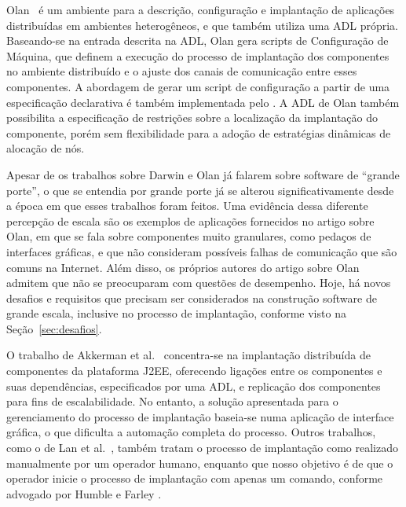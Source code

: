 Olan~\cite{Balter1998Olan} é um ambiente para a descrição, configuração e implantação de aplicações distribuídas em ambientes heterogêneos, e que também utiliza uma ADL própria. Baseando-se na entrada descrita na ADL, Olan gera scripts de Configuração de Máquina, que definem a execução do processo de implantação dos componentes no ambiente distribuído e o ajuste dos canais de comunicação entre esses componentes. A abordagem de gerar um script de configuração a partir de uma especificação declarativa é também implementada pelo \ee. A ADL de Olan também possibilita a especificação de restrições sobre a localização da implantação do componente, porém sem flexibilidade para a adoção de estratégias dinâmicas de alocação de nós.

Apesar de os trabalhos sobre Darwin e Olan já falarem sobre software de ``grande porte'', o que se entendia por grande porte já se alterou significativamente desde a época em que esses trabalhos foram feitos. Uma evidência dessa diferente percepção de escala são os exemplos de aplicações fornecidos no artigo sobre Olan, em que se fala sobre componentes muito granulares, como pedaços de interfaces gráficas, e que não consideram possíveis falhas de comunicação que são comuns na Internet. Além disso, os próprios autores do artigo sobre Olan admitem que não se preocuparam com questões de desempenho. 
Hoje, há novos  desafios e requisitos que precisam ser considerados na construção software de grande escala, inclusive no processo de implantação, conforme visto na Seção~\ref{sec:desafios}.

O trabalho de Akkerman et al.~\cite{Akkerman2005J2EE} concentra-se na implantação distribuída de componentes da plataforma J2EE, oferecendo ligações entre os componentes e suas dependências, especificados por uma ADL, e replicação dos componentes para fins de escalabilidade. No entanto, a solução apresentada para o gerenciamento do processo de implantação baseia-se numa aplicação de interface gráfica, o que dificulta a automação completa do processo. Outros trabalhos, como o de Lan et al.~\cite{Lan2005Architecture}, também tratam o processo de implantação como realizado manualmente por um operador humano, enquanto que nosso objetivo é de que o operador inicie o processo de implantação com apenas um comando, conforme advogado por Humble e Farley \cite{Humble2011Continuous}.

